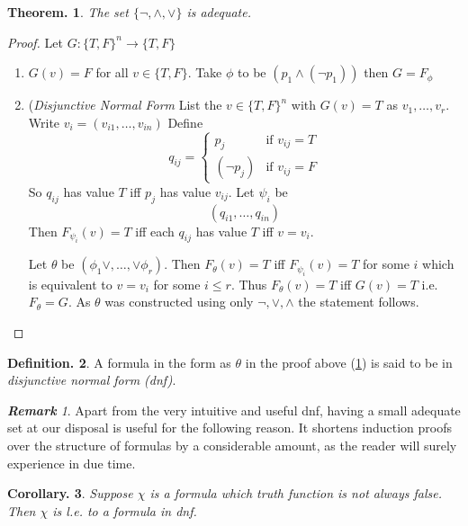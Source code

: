 \documentclass[a4paper,oneside,11pt,DIV=12,parskip=half]{scrartcl}
\theoremstyle{plain}
\newtheorem{theorem}{Theorem.}[section]
\newtheorem{corollary}[theorem]{Corollary.}
\theoremstyle{definition}
\newtheorem{definition}[theorem]{Definition.}
\newtheorem{remark, definition}[theorem]{Remark and Definition.}
\newtheorem{lemma, definition}[theorem]{Lemma and Definition.}
\newtheorem{theorem, definition}[theorem]{Theorem and Definition.}
\theoremstyle{remark}
\newtheorem*{remark}{\textbf{Remark}}
\newtheorem*{remark, example}{\textbf{Remark and Exercise}}
\begin{document}
\begin{theorem}\label{Th:connectives}
The set $\{ \lnot, \land, \lor\}$ is adequate. 
\end{theorem}

\begin{proof}
Let $G: \{T,F\}^n \rightarrow \{T,F\}$
\begin{enumerate}
\item $G(v) = F$ for all $v \in \{T,F\}$.
Take $\phi$ to be $(p_1 \land(\lnot p_1))$ then $ G = F_{\phi}$
\item (\emph{Disjunctive Normal Form}
List the $v \in \{ T,F \}^n$ with $G(v) = T$ as $v_1, \dots, v_r$.
Write $v_i = (v_{i1},\dots,v_{in})$
Define
\[ q_{ij} = \begin{cases} p_j &\text{if } v_{ij} = T \\  ( \lnot p_j) &\text{if } v_{ij} = F
\end{cases}\]
So $q_{ij}$ has value $T$ iff $p_j$ has value $v_{ij}$.
Let $\psi_i$ be
	\[ (q_{i1}, \dots, q_{in})\]
Then $F_{\psi_i}(v) = T$ iff each $q_{ij}$ has value $T$ iff $v = v_i$.

Let $\theta$ be $(\phi_1 \lor, \dots , \lor \phi_r)$.
Then $F_{\theta}(v) = T$ iff $F_{\psi_i}(v) = T$ for some $i$ which is equivalent to $v = v_i$ for some $i \leq r$.
Thus $F_{\theta} (v) = T$ iff $G(v) = T$ i.e. $F_{\theta} = G$.
As $\theta$ was constructed using only $\lnot,\lor,\land$ the statement follows.
\end{enumerate}

\end{proof}

\begin{definition}
A formula in the form as $\theta$ in the proof above (\ref{Th:connectives}) is said to be in \emph{disjunctive normal form (dnf)}.
\end{definition}

\begin{remark}

Apart from the very intuitive and useful dnf, having a small adequate set at our disposal is useful for the following reason. It shortens induction proofs over the structure of formulas by a considerable amount, as the reader will surely experience in due time.

\end{remark}

\begin{corollary} Suppose $\chi$ is a formula which truth function is not always false. Then $\chi$ is l.e. to a formula in dnf.
\end{corollary}
\end{document}
